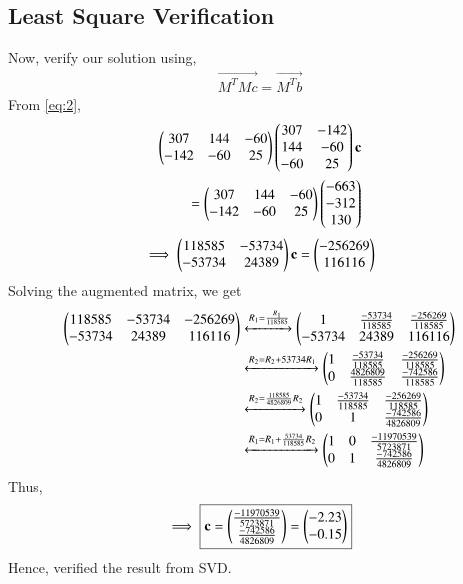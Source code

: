\begin{enumerate}
\subsection{Least Square Verification}
Now, verify our solution using,
\begin{align}
	 \vec{M^TMc} = \vec{M^Tb} 
\end{align}
From \eqref{eq:2},
\begin{align}
    \begin{pmatrix}307 & 144 & -60 \\ -142 & -60 & 25 \end{pmatrix} \begin{pmatrix}307 & -142 \\ 144 & -60 \\  -60 & 25 \end{pmatrix} \mathbf{c}\\= \begin{pmatrix}307 & 144 & -60 \\ -142 & -60 & 25 \end{pmatrix}\begin{pmatrix}-663 \\ -312 \\ 130\end{pmatrix}
\end{align}
\begin{align}
    \implies \begin{pmatrix}118585 & -53734 \\ -53734 & 24389 \end{pmatrix} \mathbf{c}= \begin{pmatrix}-256269 \\ 116116 \end{pmatrix}
\end{align}
Solving the augmented matrix, we get
\begin{align}
\begin{pmatrix}118585 & -53734 & -256269 \\ -53734 & 24389 & 116116\end{pmatrix} &\xleftrightarrow{R_1=\frac{R_1}{118585}}\begin{pmatrix}1&\frac{-53734}{118585}&\frac{-256269}{118585}\\ -53734 & 24389 & 116116\end{pmatrix}\\
&\xleftrightarrow{R_2=R_2+53734R_1}\begin{pmatrix}1&\frac{-53734}{118585}&\frac{-256269}{118585}\\ 0 & \frac{4826809}{118585} & \frac{-742586}{118585}\end{pmatrix}\\
&\xleftrightarrow{R_2=\frac{118585}{4826809}R_2}\begin{pmatrix}1&\frac{-53734}{118585}&\frac{-256269}{118585}\\ 0 & 1 & \frac{-742586}{4826809}\end{pmatrix}\\
&\xleftrightarrow{R_1=R_1+\frac{53734}{118585}R_2}\begin{pmatrix}1 & 0 & \frac{-11970539}{5723871}\\ 0 & 1 & \frac{-742586}{4826809}\end{pmatrix}
\end{align}
Thus,
\begin{align}
    \implies \boxed{\mathbf{c}= \begin{pmatrix}\frac{-11970539}{5723871}\\ \frac{-742586}{4826809}\end{pmatrix}= \begin{pmatrix}-2.23 \\ -0.15\end{pmatrix}}
\end{align}
Hence, verified the result from SVD.\\  \label{eq:conics/ex/solution/eqcen}


\end{enumerate}





